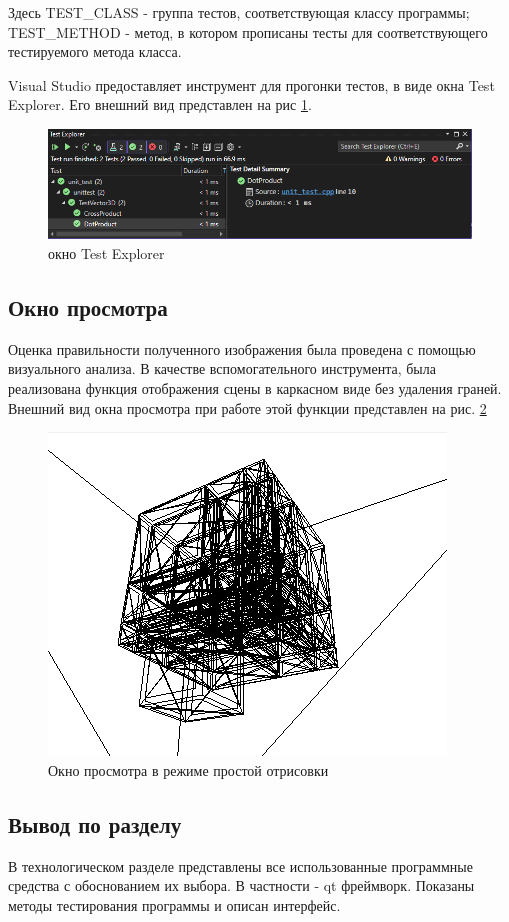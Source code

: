 \documentclass[a4paper, 14pt]{report} %
\begin{document}
	Здесь TEST\_CLASS - группа тестов, соответствующая классу программы; TEST\_METHOD - метод, в котором прописаны тесты для соответствующего тестируемого метода класса.
	
	Visual Studio предоставляет инструмент для прогонки тестов, в виде окна Test Explorer. Его внешний вид представлен на рис \ref{fig:test_explorer}.
	
	\begin{figure}[ht]
		\centering
		\includegraphics[width=1\linewidth]{img/test_explorer}
		\caption{окно Test Explorer}
		\label{fig:test_explorer}
	\end{figure}
	
	
	\subsection{Окно просмотра}
	Оценка правильности полученного изображения была проведена с помощью визуального анализа. В качестве вспомогательного инструмента, была реализована функция отображения сцены в каркасном виде без удаления граней. Внешний вид окна просмотра при работе этой функции представлен на рис. \ref{fig:scenecarcass}
	
	\begin{figure}[ht]
		\centering
		\includegraphics[width=0.7\linewidth]{img/scene_carcass}
		\caption{Окно просмотра в режиме простой отрисовки}
		\label{fig:scenecarcass}
	\end{figure}
	
	\subsection{Вывод по разделу}
	В технологическом разделе представлены все использованные программные средства с обоснованием их выбора. В частности - qt фреймворк. Показаны методы тестирования программы и описан интерфейс.
	
	
\end{document}
